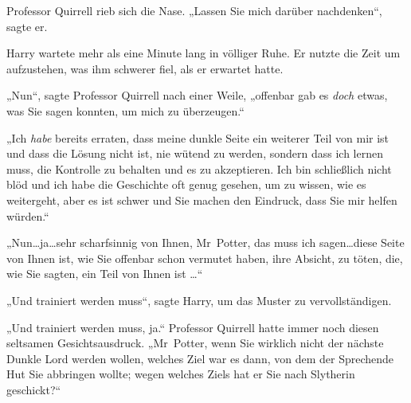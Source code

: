 Professor Quirrell rieb sich die Nase. „Lassen Sie mich darüber nachdenken“, sagte er.

Harry wartete mehr als eine Minute lang in völliger Ruhe. Er nutzte die Zeit um aufzustehen, was ihm schwerer fiel, als er erwartet hatte.

„Nun“, sagte Professor Quirrell nach einer Weile, „offenbar gab es \emph{doch} etwas, was Sie sagen konnten, um mich zu überzeugen.“

„Ich \emph{habe} bereits erraten, dass meine dunkle Seite ein weiterer Teil von mir ist und dass die Lösung nicht ist, nie wütend zu werden, sondern dass ich lernen muss, die Kontrolle zu behalten und es zu akzeptieren. Ich bin schließlich nicht blöd und ich habe die Geschichte oft genug gesehen, um zu wissen, wie es weitergeht, aber es ist schwer und Sie machen den Eindruck, dass Sie mir helfen würden.“

„Nun…ja…sehr scharfsinnig von Ihnen, Mr~Potter, das muss ich sagen…diese Seite von Ihnen ist, wie Sie offenbar schon vermutet haben, ihre Absicht, zu töten, die, wie Sie sagten, ein Teil von Ihnen ist …“

„Und trainiert werden muss“, sagte Harry, um das Muster zu vervollständigen.

„Und trainiert werden muss, ja.“ Professor Quirrell hatte immer noch diesen seltsamen Gesichtsausdruck. „Mr~Potter, wenn Sie wirklich nicht der nächste Dunkle Lord werden wollen, welches Ziel war es dann, von dem der Sprechende Hut Sie abbringen wollte; wegen welches Ziels hat er Sie nach Slytherin geschickt?“

